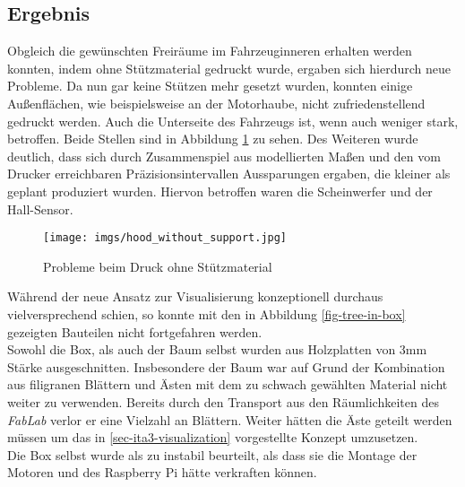 \documentclass[.../Dokumentation.tex]{subfiles}
\begin{document}
\subsection{Ergebnis}\label{sec-ita3-result}
Obgleich die gewünschten Freiräume im Fahrzeuginneren erhalten werden konnten, 
indem ohne Stützmaterial gedruckt wurde, ergaben sich hierdurch neue Probleme.
Da nun gar keine Stützen mehr gesetzt wurden, konnten einige Außenflächen, wie 
beispielsweise an der Motorhaube, nicht zufriedenstellend gedruckt werden.
Auch die Unterseite des Fahrzeugs ist, wenn auch weniger stark, betroffen.
Beide Stellen sind in Abbildung \ref{fig-hood-no-support} zu sehen.
Des Weiteren wurde deutlich, dass sich durch Zusammenspiel aus modellierten 
Maßen und den vom Drucker erreichbaren Präzisionsintervallen Aussparungen 
ergaben, die kleiner als geplant produziert wurden.
Hiervon betroffen waren die Scheinwerfer und der Hall-Sensor.
\begin{figure}[H]
\begin{center}
    \texttt{[image: imgs/hood\_without\_support.jpg]}
    \caption{Probleme beim Druck ohne Stützmaterial}
    \label{fig-hood-no-support}
\end{center}
\end{figure}
\noindent
Während der neue Ansatz zur Visualisierung konzeptionell durchaus 
vielversprechend schien, so konnte mit den in Abbildung \ref{fig-tree-in-box} 
gezeigten Bauteilen nicht fortgefahren werden. \\
Sowohl die Box, als auch der Baum selbst wurden aus Holzplatten von 3mm 
Stärke ausgeschnitten. Insbesondere der Baum war auf Grund der Kombination 
aus filigranen Blättern und Ästen mit dem zu schwach gewählten Material nicht 
weiter zu verwenden. Bereits durch den Transport aus den Räumlichkeiten 
des \textit{FabLab} verlor er eine Vielzahl an Blättern. Weiter hätten die Äste 
geteilt werden müssen um das in \ref{sec-ita3-visualization} vorgestellte 
Konzept umzusetzen.\\
Die Box selbst wurde als zu instabil beurteilt, als dass sie die Montage 
der Motoren und des Raspberry Pi hätte verkraften können.
\end{document}
